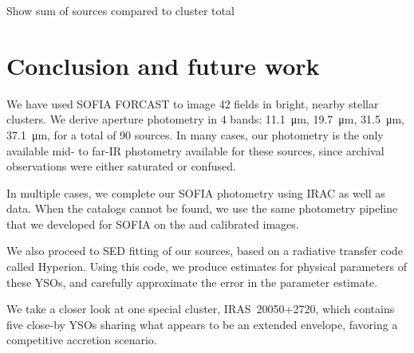Show sum of sources compared to cluster total


\section{Conclusion and future work}

We have used SOFIA FORCAST to image 42 fields in bright, nearby stellar clusters. We derive aperture photometry in 4 bands: \SI{11.1}{\um}, \SI{19.7}{\um}, \SI{31.5}{\um}, \SI{37.1}{\um}, for a total of 90 sources. In many cases, our photometry is the only available mid- to far-IR photometry available for these sources, since archival \Spitzer observations were either saturated or confused.

In multiple cases, we complete our SOFIA photometry using \Spitzer IRAC as well as \Herschel data. When the catalogs cannot be found, we use the same photometry pipeline that we developed for SOFIA on the \Spitzer and \Herschel calibrated images.

We also proceed to SED fitting of our sources, based on a radiative transfer code called Hyperion. Using this code, we produce estimates for physical parameters of these YSOs, and carefully approximate the error in the parameter estimate.

We take a closer look at one special cluster, IRAS~20050+2720, which contains five close-by YSOs sharing what appears to be an extended envelope, favoring a competitive accretion scenario.

